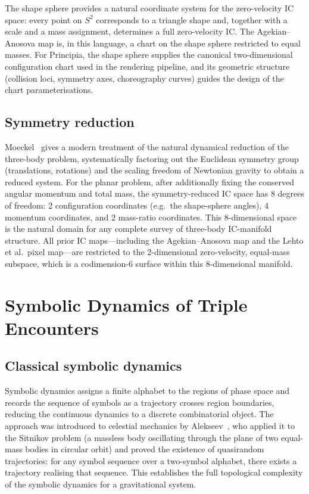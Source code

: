 \documentclass[11pt,a4paper]{article}
\begin{document}
The shape sphere provides a natural coordinate system for the zero-velocity IC space: every
point on $S^2$ corresponds to a triangle shape and, together with a scale and a mass
assignment, determines a full zero-velocity IC.  The Agekian--Anosova map is, in this language,
a chart on the shape sphere restricted to equal masses.  For Principia, the shape sphere
supplies the canonical two-dimensional configuration chart used in the rendering pipeline, and
its geometric structure (collision loci, symmetry axes, choreography curves) guides the design
of the chart parameterisations.

\subsection{Symmetry reduction}

Moeckel~\cite{moeckel2023} gives a modern treatment of the natural dynamical reduction of the
three-body problem, systematically factoring out the Euclidean symmetry group (translations,
rotations) and the scaling freedom of Newtonian gravity to obtain a reduced system.  For the
planar problem, after additionally fixing the conserved angular momentum and total mass, the
symmetry-reduced IC space has 8 degrees of freedom: 2 configuration coordinates (e.g.\ the
shape-sphere angles), 4 momentum coordinates, and 2 mass-ratio coordinates.  This 8-dimensional
space is the natural domain for any complete survey of three-body IC-manifold structure.  All
prior IC maps---including the Agekian--Anosova map and the Lehto et al.\ pixel map---are
restricted to the 2-dimensional zero-velocity, equal-mass subspace, which is a
codimension-6 surface within this 8-dimensional manifold.

\section{Symbolic Dynamics of Triple Encounters}
\label{sec:symbolic}

\subsection{Classical symbolic dynamics}
\label{sec:classical_symbolic}

Symbolic dynamics assigns a finite alphabet to the regions of phase space and records the
sequence of symbols as a trajectory crosses region boundaries, reducing the continuous dynamics
to a discrete combinatorial object.  The approach was introduced to celestial mechanics by
Alekseev~\cite{alekseev1969}, who applied it to the Sitnikov problem (a massless body
oscillating through the plane of two equal-mass bodies in circular orbit) and proved the
existence of quasirandom trajectories: for any symbol sequence over a two-symbol alphabet,
there exists a trajectory realising that sequence.  This establishes the full topological
complexity of the symbolic dynamics for a gravitational system.
\end{document}
